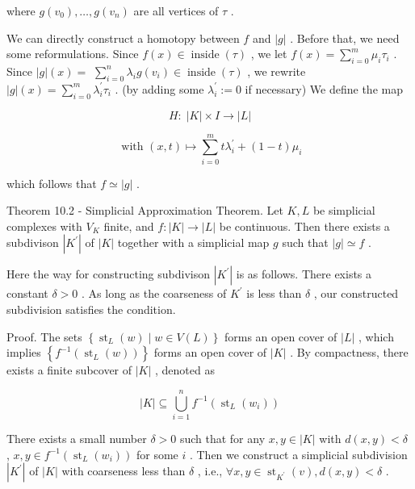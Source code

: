 where \(g\left( {v}_{0}\right) ,\ldots ,g\left( {v}_{n}\right)\) are all vertices of \(\tau\) .

We can directly construct a homotopy between \(f\) and \(\left| g\right|\) . Before that, we need some reformulations. Since \(f\left( x\right)  \in  \operatorname{inside}\left( \tau \right)\) , we let \(f\left( x\right)  = \mathop{\sum }\limits_{{i = 0}}^{m}{\mu }_{i}{\tau }_{i}\) . Since \(\left| g\right| \left( x\right)  =\)  \(\mathop{\sum }\limits_{{i = 0}}^{n}{\lambda }_{i}g\left( {v}_{i}\right)  \in  \operatorname{inside}\left( \tau \right)\) , we rewrite \(\left| g\right| \left( x\right)  = \mathop{\sum }\limits_{{i = 0}}^{m}{\lambda }_{i}^{\prime }{\tau }_{i}\) . (by adding some \({\lambda }_{i}^{\prime } \mathrel{\text{ := }} 0\) if necessary) We define the map

\[
H : \;\left| K\right|  \times  I \rightarrow  \left| L\right|
\]

\[
\text{ with }\left( {x,t}\right)  \mapsto  \mathop{\sum }\limits_{{i = 0}}^{m}t{\lambda }_{i}^{\prime } + \left( {1 - t}\right) {\mu }_{i}
\]

which follows that \(f \simeq  \left| g\right|\) .

Theorem 10.2 - Simplicial Approximation Theorem. Let \(K,L\) be simplicial complexes with \({V}_{K}\) finite, and \(f : \left| K\right|  \rightarrow  \left| L\right|\) be continuous. Then there exists a subdivison \(\left| {K}^{\prime }\right|\) of \(\left| K\right|\) together with a simplicial map \(g\) such that \(\left| g\right|  \simeq  f\) .

Here the way for constructing subdivison \(\left| {K}^{\prime }\right|\) is as follows. There exists a constant \(\delta  > 0\) . As long as the coarseness of \({K}^{\prime }\) is less than \(\delta\) , our constructed subdivision satisfies the condition.

Proof. The sets \(\left\{  {{\operatorname{st}}_{L}\left( w\right)  \mid  w \in  V\left( L\right) }\right\}\) forms an open cover of \(\left| L\right|\) , which implies \(\left\{  {{f}^{-1}\left( {{\operatorname{st}}_{L}\left( w\right) }\right) }\right\}\) forms an open cover of \(\left| K\right|\) . By compactness, there exists a finite subcover of \(\left| K\right|\) , denoted as

\[
\left| K\right|  \subseteq  \mathop{\bigcup }\limits_{{i = 1}}^{n}{f}^{-1}\left( {{\operatorname{st}}_{L}\left( {w}_{i}\right) }\right)
\]

There exists a small number \(\delta  > 0\) such that for any \(x,y \in  \left| K\right|\) with \(d\left( {x,y}\right)  < \delta\) , \(x,y \in  {f}^{-1}\left( {{\operatorname{st}}_{L}\left( {w}_{i}\right) }\right)\) for some \(i\) . Then we construct a simplicial subdivision \(\left| {K}^{\prime }\right|\) of \(\left| K\right|\) with coarseness less than \(\delta\) , i.e., \(\forall x,y \in  {\operatorname{st}}_{{K}^{\prime }}\left( v\right) ,d\left( {x,y}\right)  < \delta\) .

